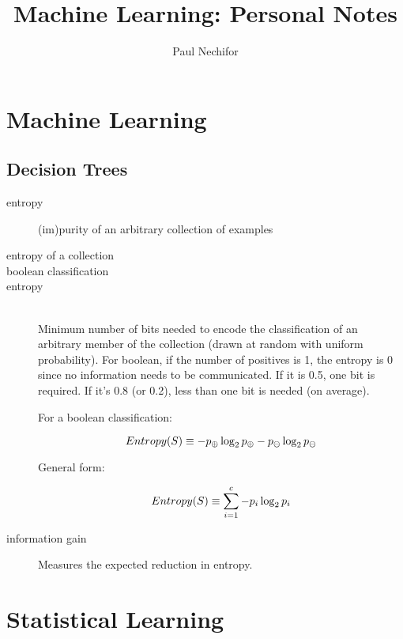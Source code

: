 \documentclass[12pt]{article}
\title{Machine Learning: Personal Notes}
\author{Paul Nechifor}
\newcommand{\hitem}[1][default] {
    \item[#1] \hfill \\ 
}
\begin{document}
\maketitle

\section{Machine Learning}

\subsection{Decision Trees}

\begin{description}

\item[entropy] (im)purity of an arbitrary collection of examples

\item[entropy of a collection]

\item[boolean classification]

\hitem[entropy]
Minimum number of bits needed to encode the classification of an arbitrary
member of the collection (drawn at random with uniform probability). For
boolean, if the number of positives is 1, the entropy is 0 since no information
needs to be communicated. If it is 0.5, one bit is required. If it's 0.8 (or
0.2), less than one bit is needed (on average).

For a boolean classification:

\begin{equation}
    Entropy(S) \equiv -p_\oplus \log_2 p_\oplus - p_\ominus \log_2 p_\ominus
    \notag
\end{equation}

General form:

\begin{equation}
    Entropy(S) \equiv \sum\limits_{i=1}^c -p_i \log_2 p_i
    \notag
\end{equation}

\item[information gain] Measures the expected reduction in entropy.

\end{description}


\section{Statistical Learning}
\end{document}
